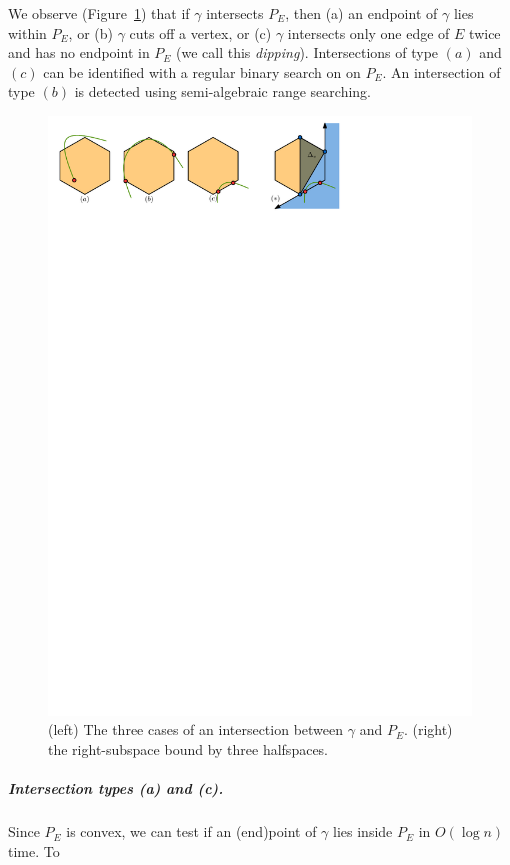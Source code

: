 \documentclass[UKenglish]{lipics-v2019}
\begin{document}
We observe (Figure~\ref{fig:intersectionsearch}) that if $\gamma$ intersects
$P_E$, then (a) an endpoint of $\gamma$ lies within $P_E$, or (b) $\gamma$ cuts
off a vertex, or (c) $\gamma$ intersects only one edge of $E$ twice and has no
endpoint in $P_E$ (we call this \emph{dipping}). Intersections of type $(a)$
and $(c)$ can be identified with a regular binary search on on $P_E$. An
intersection of type $(b)$ is detected using semi-algebraic range searching.
%
\begin{figure}[tb]
    \centering
    \includegraphics{../intersectionsearch}
    \caption{(left) The three cases of an intersection between $\gamma$ and $P_E$. (right) the right-subspace bound by three halfspaces.}
    \label{fig:intersectionsearch}
\end{figure}
%
\subparagraph{Intersection types (a) and (c).} Since $P_E$ is convex, we can
test if an (end)point of $\gamma$ lies inside $P_E$ in $O(\log n)$ time. To
\end{document}
